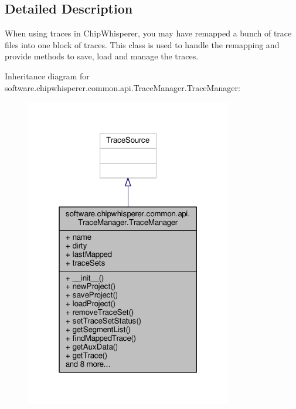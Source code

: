 \subsection{Detailed Description}
\begin{DoxyVerb}When using traces in ChipWhisperer, you may have remapped a bunch of trace files into one
block of traces. This class is used to handle the remapping and provide methods to save,
load and manage the traces.
\end{DoxyVerb}
 

Inheritance diagram for software.\+chipwhisperer.\+common.\+api.\+Trace\+Manager.\+Trace\+Manager\+:\nopagebreak
\begin{figure}[H]
\begin{center}
\leavevmode
\includegraphics[width=256pt]{d3/d2d/classsoftware_1_1chipwhisperer_1_1common_1_1api_1_1TraceManager_1_1TraceManager__inherit__graph}
\end{center}
\end{figure}


